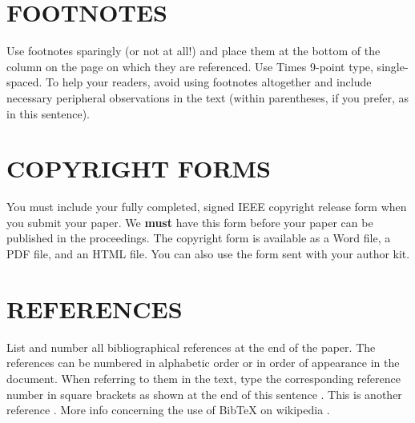 \documentclass{article}
\begin{document}
\vfill
\pagebreak


\section{FOOTNOTES}
\label{sec:foot}

Use footnotes sparingly (or not at all!) and place them at the bottom of the
column on the page on which they are referenced. Use Times 9-point type,
single-spaced. To help your readers, avoid using footnotes altogether and
include necessary peripheral observations in the text (within parentheses, if
you prefer, as in this sentence).


\section{COPYRIGHT FORMS}
\label{sec:copyright}

You must include your fully completed, signed IEEE copyright release form when
you submit your paper. We {\bf must} have this form before your paper can be
published in the proceedings.  The copyright form is available as a Word file,
a PDF file, and an HTML file. You can also use the form sent with your author
kit.

\section{REFERENCES}
\label{sec:ref}

List and number all bibliographical references at the end of the paper.  The references can be numbered in alphabetic order or in order of appearance in the document.  When referring to them in the text, type the corresponding reference number in square brackets as shown at the end of this sentence \cite{C2}.
This is another reference \cite{GW}. More info concerning the use of BibTeX on wikipedia \cite{wiki}.





\end{document}
